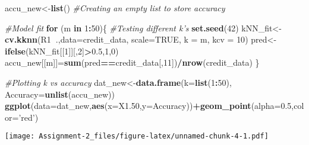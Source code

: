 \documentclass[
]{article}
\newenvironment{Shaded}{\begin{snugshade}}{\end{snugshade}}
\newcommand{\CommentTok}[1]{\textcolor[rgb]{0.56,0.35,0.01}{\textit{#1}}}
\newcommand{\ControlFlowTok}[1]{\textcolor[rgb]{0.13,0.29,0.53}{\textbf{#1}}}
\newcommand{\DataTypeTok}[1]{\textcolor[rgb]{0.13,0.29,0.53}{#1}}
\newcommand{\DecValTok}[1]{\textcolor[rgb]{0.00,0.00,0.81}{#1}}
\newcommand{\FloatTok}[1]{\textcolor[rgb]{0.00,0.00,0.81}{#1}}
\newcommand{\KeywordTok}[1]{\textcolor[rgb]{0.13,0.29,0.53}{\textbf{#1}}}
\newcommand{\NormalTok}[1]{#1}
\newcommand{\OperatorTok}[1]{\textcolor[rgb]{0.81,0.36,0.00}{\textbf{#1}}}
\newcommand{\OtherTok}[1]{\textcolor[rgb]{0.56,0.35,0.01}{#1}}
\newcommand{\StringTok}[1]{\textcolor[rgb]{0.31,0.60,0.02}{#1}}
\begin{document}
\begin{Shaded}
\begin{Highlighting}[]
\NormalTok{accu_new<-}\KeywordTok{list}\NormalTok{() }\CommentTok{#Creating an empty list to store accuracy}

\CommentTok{#Model fit}
\ControlFlowTok{for}\NormalTok{ (m }\ControlFlowTok{in} \DecValTok{1}\OperatorTok{:}\DecValTok{50}\NormalTok{)\{ }\CommentTok{#Testing different k's}
  \KeywordTok{set.seed}\NormalTok{(}\DecValTok{42}\NormalTok{)}
\NormalTok{  kNN_fit<-}\KeywordTok{cv.kknn}\NormalTok{(R1}\OperatorTok{~}\NormalTok{.,}\DataTypeTok{data=}\NormalTok{credit_data, }
                   \DataTypeTok{scale=}\OtherTok{TRUE}\NormalTok{, }\DataTypeTok{k =}\NormalTok{ m, }\DataTypeTok{kcv =} \DecValTok{10}\NormalTok{)}
\NormalTok{  pred<-}\KeywordTok{ifelse}\NormalTok{(kNN_fit[[}\DecValTok{1}\NormalTok{]][,}\DecValTok{2}\NormalTok{]}\OperatorTok{>}\FloatTok{0.5}\NormalTok{,}\DecValTok{1}\NormalTok{,}\DecValTok{0}\NormalTok{)}
\NormalTok{  accu_new[[m]]=}\KeywordTok{sum}\NormalTok{(pred}\OperatorTok{==}\NormalTok{credit_data[,}\DecValTok{11}\NormalTok{])}\OperatorTok{/}\KeywordTok{nrow}\NormalTok{(credit_data)}
\NormalTok{\}}

\CommentTok{#Plotting k vs accuracy}
\NormalTok{dat_new<-}\KeywordTok{data.frame}\NormalTok{(}\DataTypeTok{k=}\KeywordTok{list}\NormalTok{(}\DecValTok{1}\OperatorTok{:}\DecValTok{50}\NormalTok{), }\DataTypeTok{Accuracy=}\KeywordTok{unlist}\NormalTok{(accu_new))}
\KeywordTok{ggplot}\NormalTok{(}\DataTypeTok{data=}\NormalTok{dat_new,}\KeywordTok{aes}\NormalTok{(}\DataTypeTok{x=}\NormalTok{X1}\FloatTok{.50}\NormalTok{,}\DataTypeTok{y=}\NormalTok{Accuracy))}\OperatorTok{+}\KeywordTok{geom_point}\NormalTok{(}\DataTypeTok{alpha=}\FloatTok{0.5}\NormalTok{,}\DataTypeTok{color=}\StringTok{'red'}\NormalTok{)}
\end{Highlighting}
\end{Shaded}

\texttt{[image: Assignment-2\_files/figure-latex/unnamed-chunk-4-1.pdf]}

\begin{Shaded}
\end{Shaded}
\end{document}
